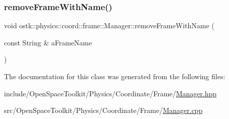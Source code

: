 \mbox{\label{classostk_1_1physics_1_1coord_1_1frame_1_1_manager_ada10a8a3ff3ced0182bbb2a42abbbb71}} 
\subsubsection{\texorpdfstring{remove\+Frame\+With\+Name()}{removeFrameWithName()}}
{\footnotesize\ttfamily void ostk\+::physics\+::coord\+::frame\+::\+Manager\+::remove\+Frame\+With\+Name (\begin{DoxyParamCaption}\item[{const String \&}]{a\+Frame\+Name }\end{DoxyParamCaption})}



The documentation for this class was generated from the following files\+:\begin{DoxyCompactItemize}
\item 
include/\+Open\+Space\+Toolkit/\+Physics/\+Coordinate/\+Frame/\hyperlink{_coordinate_2_frame_2_manager_8hpp}{Manager.\+hpp}\item 
src/\+Open\+Space\+Toolkit/\+Physics/\+Coordinate/\+Frame/\hyperlink{_coordinate_2_frame_2_manager_8cpp}{Manager.\+cpp}\end{DoxyCompactItemize}
